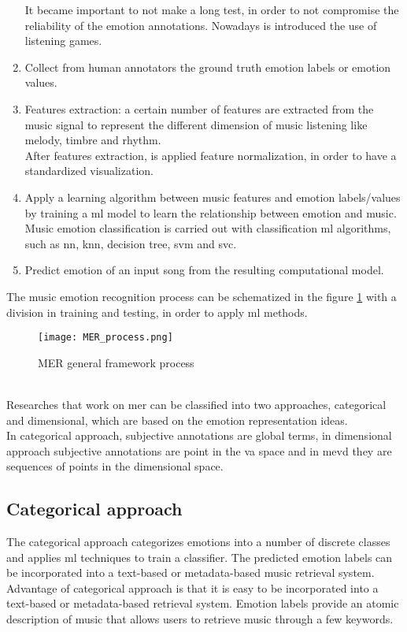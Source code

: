 \begin{enumerate}
	It became important to not make a long test, in order to not compromise the reliability of the emotion annotations. Nowadays is introduced the use of listening games.
	\item Collect from human annotators the ground truth emotion labels or emotion values.
	\item Features extraction: a certain number of features are extracted from the music signal to represent the different dimension of music listening like melody, timbre and rhythm.
	\\
	After features extraction, is applied feature normalization, in order to have a standardized visualization.
	\item Apply a learning algorithm between music features and emotion labels/values by training a \gls{ml} model to learn the relationship between emotion and music. Music emotion classification is carried out with classification \gls{ml} algorithms, such as \gls{nn}, \gls{knn}, decision tree, \gls{svm} and \gls{svc}.
	\item Predict emotion of an input song from the resulting computational model.
\end{enumerate}
The music emotion recognition process can be schematized in the figure \ref{fig:MER_process} with a division in training and testing, in order to apply \gls{ml} methods.
\begin{figure}[h]
    \centering
    \texttt{[image: MER\_process.png]} 
	\caption{MER general framework process}
    \label{fig:MER_process}
\end{figure}
\\
Researches that work on \gls{mer} can be classified into two approaches, categorical and dimensional, which are based on the emotion representation ideas.
\\
In categorical approach, subjective annotations are global terms, in dimensional approach subjective annotations are point in the \gls{va} space and in \gls{mevd} they are sequences of points in the dimensional space.

\subsection{Categorical approach}
The categorical approach categorizes emotions into a number of discrete classes and applies \gls{ml} techniques to train a classifier. The predicted emotion labels can be incorporated into a text-based or metadata-based music retrieval system.
\\
Advantage of categorical approach is that it is easy to be incorporated into a text-based or metadata-based retrieval system. Emotion labels provide an atomic description of music that allows users to retrieve music through a few keywords.

